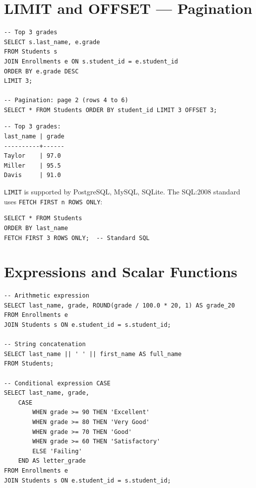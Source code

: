 \section{LIMIT and OFFSET --- Pagination}

\begin{codeblock}[title=\textbf{Limiting Results}]
\begin{verbatim}
-- Top 3 grades
SELECT s.last_name, e.grade
FROM Students s
JOIN Enrollments e ON s.student_id = e.student_id
ORDER BY e.grade DESC
LIMIT 3;

-- Pagination: page 2 (rows 4 to 6)
SELECT * FROM Students ORDER BY student_id LIMIT 3 OFFSET 3;
\end{verbatim}
\end{codeblock}

\begin{codeoutput}
\begin{verbatim}
-- Top 3 grades:
last_name | grade
----------+------
Taylor    | 97.0
Miller    | 95.5
Davis     | 91.0
\end{verbatim}
\end{codeoutput}

\begin{warning}[title=\textbf{LIMIT Is Not Standard SQL}]
\texttt{LIMIT} is supported by PostgreSQL, MySQL, SQLite.
The SQL:2008 standard uses \texttt{FETCH FIRST n ROWS ONLY}:
\begin{verbatim}
SELECT * FROM Students
ORDER BY last_name
FETCH FIRST 3 ROWS ONLY;  -- Standard SQL
\end{verbatim}
\end{warning}

\section{Expressions and Scalar Functions}

\begin{codeblock}[title=\textbf{Computed Expressions}]
\begin{verbatim}
-- Arithmetic expression
SELECT last_name, grade, ROUND(grade / 100.0 * 20, 1) AS grade_20
FROM Enrollments e
JOIN Students s ON e.student_id = s.student_id;

-- String concatenation
SELECT last_name || ' ' || first_name AS full_name
FROM Students;

-- Conditional expression CASE
SELECT last_name, grade,
    CASE
        WHEN grade >= 90 THEN 'Excellent'
        WHEN grade >= 80 THEN 'Very Good'
        WHEN grade >= 70 THEN 'Good'
        WHEN grade >= 60 THEN 'Satisfactory'
        ELSE 'Failing'
    END AS letter_grade
FROM Enrollments e
JOIN Students s ON e.student_id = s.student_id;
\end{verbatim}
\end{codeblock}

